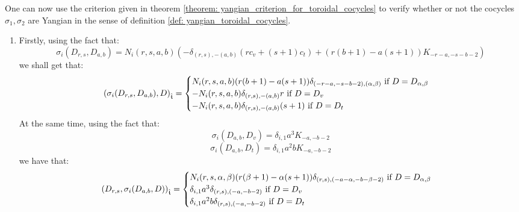 \begin{example}
            One can now use the criterion given in theorem \ref{theorem: yangian_criterion_for_toroidal_cocycles} to verify whether or not the cocycles $\sigma_1, \sigma_2$ are Yangian in the sense of definition \ref{def: yangian_toroidal_cocycles}.
            \begin{enumerate}
                \item Firstly, using the fact that:
                    $$\sigma_i(D_{r, s}, D_{a, b}) = N_i(r, s, a, b) \left( -\delta_{(r, s), -(a, b)} (r c_v + (s + 1) c_t) + ( r(b + 1) - a(s + 1) )K_{-r - a, -s - b - 2} \right)$$
                we shall get that:
                    $$
                        \left( \sigma_i(D_{r, s}, D_{a, b}), D \right)_{\extendedtoroidal} =
                        \begin{cases}
                            \text{$N_i(r, s, a, b) ( r(b + 1) - a(s + 1) ) \delta_{(-r - a, -s - b - 2), (\alpha, \beta)}$ if $D = D_{\alpha, \beta}$}
                            \\
                            \text{$-N_i(r, s, a, b) \delta_{(r, s), -(a, b)} r$ if $D = D_v$}
                            \\
                            \text{$-N_i(r, s, a, b) \delta_{(r, s), -(a, b)} (s + 1)$ if $D = D_t$}
                        \end{cases}
                    $$
                At the same time, using the fact that:
                    $$\sigma_i(D_{a, b}, D_v) = \delta_{i, 1} a^3 K_{-a, -b - 2}$$
                    $$\sigma_i(D_{a, b}, D_t) = \delta_{i, 1} a^2b K_{-a, -b - 2}$$
                we have that:
                    $$
                        \begin{aligned}
                            \left( D_{r, s}, \sigma_i(D_{a, b}, D) \right)_{\extendedtoroidal} =
                            \begin{cases}
                                \text{$N_i(r, s, \alpha, \beta) ( r(\beta + 1) - \alpha(s + 1) ) \delta_{(r, s), (-a - \alpha, -b - \beta - 2)}$ if $D = D_{\alpha, \beta}$}
                                \\
                                \text{$\delta_{i, 1} a^3 \delta_{(r, s), (-a, -b - 2)}$ if $D = D_v$}
                                \\
                                \text{$\delta_{i, 1} a^2 b \delta_{(r, s), (-a, -b - 2)}$ if $D = D_t$}
                            \end{cases}

\end{aligned}$$
\end{enumerate}
\end{example}
